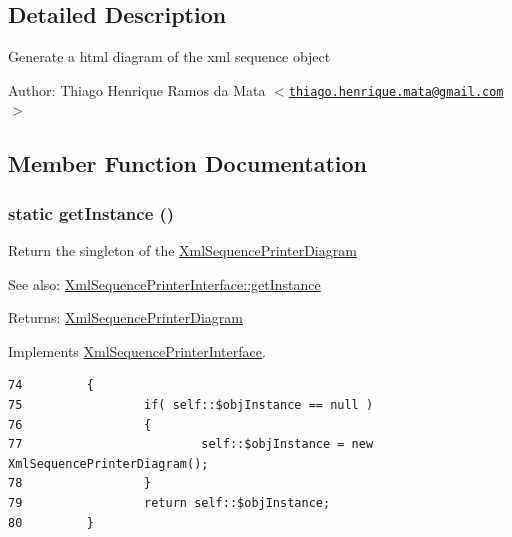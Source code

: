 \subsection{Detailed Description}
Generate a html diagram of the xml sequence object

\begin{Desc}
\item[Author:]Thiago Henrique Ramos da Mata $<$\href{mailto:thiago.henrique.mata@gmail.com}{\tt thiago.henrique.mata@gmail.com}$>$ \end{Desc}


\subsection{Member Function Documentation}
\hypertarget{class_xml_sequence_printer_diagram_c93fbec81f07e5d15f80db907e63dc10}{
\subsubsection[{getInstance}]{\setlength{\rightskip}{0pt plus 5cm}static getInstance ()}}
\label{class_xml_sequence_printer_diagram_c93fbec81f07e5d15f80db907e63dc10}


Return the singleton of the \hyperlink{class_xml_sequence_printer_diagram}{XmlSequencePrinterDiagram}

\begin{Desc}
\item[See also:]\hyperlink{interface_xml_sequence_printer_interface_c93fbec81f07e5d15f80db907e63dc10}{XmlSequencePrinterInterface::getInstance} \end{Desc}
\begin{Desc}
\item[Returns:]\hyperlink{class_xml_sequence_printer_diagram}{XmlSequencePrinterDiagram} \end{Desc}


Implements \hyperlink{interface_xml_sequence_printer_interface_c93fbec81f07e5d15f80db907e63dc10}{XmlSequencePrinterInterface}.

\begin{Code}\begin{verbatim}74         {
75                 if( self::$objInstance == null )
76                 {
77                         self::$objInstance = new XmlSequencePrinterDiagram();
78                 }
79                 return self::$objInstance;
80         }
\end{verbatim}
\end{Code}


